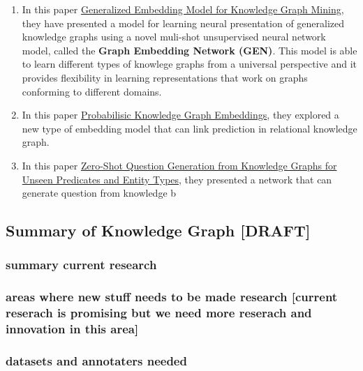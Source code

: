 \documentclass[]{book}
\theoremstyle{definition}
\theoremstyle{definition}
\theoremstyle{definition}
\theoremstyle{remark}
\begin{document}
\begin{enumerate}
\def\labelenumi{\arabic{enumi}.}
\item
  In this paper
  \href{http://www.mlgworkshop.org/2018/papers/MLG2018_paper_5.pdf}{Generalized
  Embedding Model for Knowledge Graph Mining}, they have presented a
  model for learning neural presentation of generalized knowledge graphs
  using a novel muli-shot unsupervised neural network model, called the
  \textbf{Graph Embedding Network (GEN)}. This model is able to learn
  different types of knowlege graphs from a universal perspective and it
  provides flexibility in learning representations that work on graphs
  conforming to different domains.
\item
  In this paper
  \href{https://openreview.net/pdf?id=rJ4qXnCqFX}{Probabilisic Knowledge
  Graph Embeddings}, they explored a new type of embedding model that
  can link prediction in relational knowledge graph.
\item
  In this paper \href{http://aclweb.org/anthology/N18-1020}{Zero-Shot
  Question Generation from Knowledge Graphs for Unseen Predicates and
  Entity Types}, they presented a network that can generate question
  from knowledge b
\end{enumerate}

\subsection{Summary of Knowledge Graph
{[}DRAFT{]}}\label{summary-of-knowledge-graph-draft}

\subsubsection{summary current
research}\label{summary-current-research-1}

\subsubsection{areas where new stuff needs to be made research
{[}current reserach is promising but we need more reserach and
innovation in this
area{]}}\label{areas-where-new-stuff-needs-to-be-made-research-current-reserach-is-promising-but-we-need-more-reserach-and-innovation-in-this-area-1}

\subsubsection{datasets and annotaters
needed}\label{datasets-and-annotaters-needed-1}
\end{document}
